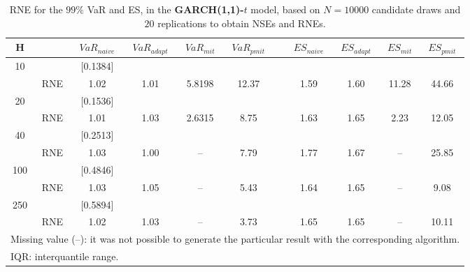 \footnotesize{  
{ \renewcommand{\arraystretch}{1.3} 
\begin{longtable}{ccccccccccc}  
\caption{RNE for the $99\%$ VaR and ES, in the \textbf{GARCH(1,1)-$t$} model, based on $N=10000$ candidate draws and $20$ replications to obtain NSEs and RNEs.} 
\label{tab:res_RNE_t_garch2_noS} \\ 
 H & & $VaR_{naive}$ & $VaR_{adapt}$ & $VaR_{mit}$  & $VaR_{pmit}$ &  & $ES_{naive}$ & $ES_{adapt}$ & $ES_{mit}$ & $ES_{pmit}$ \\ \hline 
10 & & $[$0.1384$]$  \\  
  & RNE &   1.02 &   1.01 & 5.8198 &  12.37 &  &  1.59 &   1.60 &   11.28 &  44.66   \\ [1ex] 
20 & & $[$0.1536$]$  \\  
  & RNE &   1.01 &   1.03 & 2.6315 &   8.75 &  &  1.63 &   1.65 &    2.23 &  12.05   \\ [1ex] 
40 & & $[$0.2513$]$  \\  
  & RNE &   1.03 &   1.00 &    -- &   7.79 &  &  1.77 &   1.67 &     -- &  25.85   \\ [1ex] 
100 & & $[$0.4846$]$  \\  
  & RNE &   1.03 &   1.05 &    -- &   5.43 &  &  1.64 &   1.65 &     -- &   9.08   \\ [1ex] 
250 & & $[$0.5894$]$  \\  
  & RNE &   1.02 &   1.03 &    -- &   3.73 &  &  1.65 &   1.65 &     -- &  10.11   \\ [1ex] 
\hline 
  \multicolumn{11}{l}{\footnotesize{Missing value (--): it was not possible to generate the particular result with the corresponding algorithm.}} \\ 
  \multicolumn{11}{l}{\footnotesize{IQR: interquantile range.}} \\ 
\end{longtable} 
} 
} 
\normalsize 
